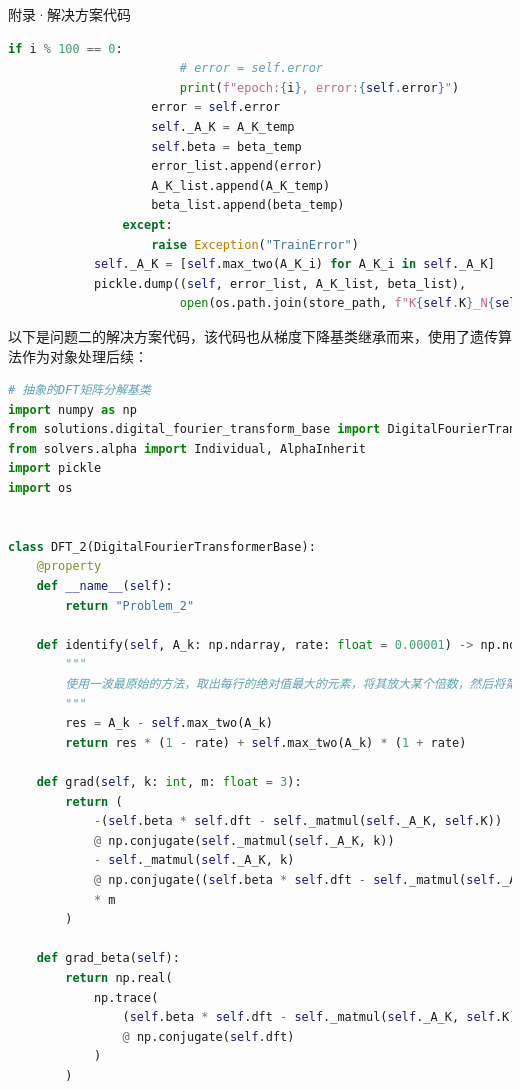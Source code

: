 \documentclass[11pt]{article}
\begin{document}
\begin{section}{附录·解决方案代码}
\begin{lstlisting}[language=Python]
                    if i % 100 == 0:
                        # error = self.error
                        print(f"epoch:{i}, error:{self.error}")
                    error = self.error
                    self._A_K = A_K_temp
                    self.beta = beta_temp
                    error_list.append(error)
                    A_K_list.append(A_K_temp)
                    beta_list.append(beta_temp)
                except:
                    raise Exception("TrainError")
            self._A_K = [self.max_two(A_K_i) for A_K_i in self._A_K]
            pickle.dump((self, error_list, A_K_list, beta_list),
                        open(os.path.join(store_path, f"K{self.K}_N{self.N}_lr{lr}_"+self.__name__+'.pkl'), 'wb'))    
 \end{lstlisting}
 以下是问题二的解决方案代码，该代码也从梯度下降基类继承而来，使用了遗传算法作为对象处理后续：
 \begin{lstlisting}[language=Python]
  # 抽象的DFT矩阵分解基类
import numpy as np
from solutions.digital_fourier_transform_base import DigitalFourierTransformerBase
from solvers.alpha import Individual, AlphaInherit
import pickle
import os


class DFT_2(DigitalFourierTransformerBase):
    @property
    def __name__(self):
        return "Problem_2"

    def identify(self, A_k: np.ndarray, rate: float = 0.00001) -> np.ndarray:
        """
        使用一波最原始的方法，取出每行的绝对值最大的元素，将其放大某个倍数，然后将第二大的也放大这个位数，将其他的缩小某个倍数。
        """
        res = A_k - self.max_two(A_k)
        return res * (1 - rate) + self.max_two(A_k) * (1 + rate)

    def grad(self, k: int, m: float = 3):
        return (
            -(self.beta * self.dft - self._matmul(self._A_K, self.K))
            @ np.conjugate(self._matmul(self._A_K, k))
            - self._matmul(self._A_K, k)
            @ np.conjugate((self.beta * self.dft - self._matmul(self._A_K, self.K)))
            * m
        )

    def grad_beta(self):
        return np.real(
            np.trace(
                (self.beta * self.dft - self._matmul(self._A_K, self.K))
                @ np.conjugate(self.dft)
            )
        )


\end{lstlisting}
\end{section}
\end{document}
